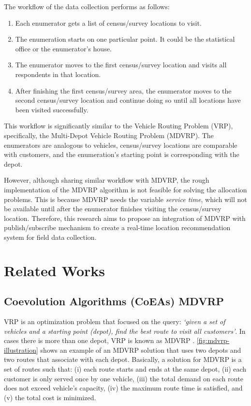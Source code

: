 \documentclass[conference]{IEEEtran}
\begin{document}
The workflow of the data collection performs as follows: 
\begin{enumerate}
	\item Each enumerator gets a list of census/survey locations to visit. 
	\item The enumeration starts on one particular point. It could be the statistical office or the enumerator's house. 
	\item The enumerator moves to the first census/survey location and visits all respondents in that location. 
	\item After finishing the first census/survey area, the enumerator moves to the second census/survey location and continue doing so until all locations have been visited successfully.
\end{enumerate}
This workflow is significantly similar to the Vehicle Routing Problem (VRP), specifically, the Multi-Depot Vehicle Routing Problem (MDVRP). The enumerators are analogous to vehicles, census/survey locations are comparable with customers, and the enumeration's starting point is corresponding with the depot. 

However, although sharing similar workflow with MDVRP, the rough implementation of the MDVRP algorithm is not feasible for solving the allocation problems. This is because MDVRP needs the variable \textit{service time}, which will not be available until after the enumerator finishes visiting the census/survey location. Therefore, this research aims to propose an integration of MDVRP with publish/subscribe mechanism to create a real-time location recommendation system for field data collection. 


\section{Related Works}
\label{sec:related-works}

\subsection{Coevolution Algorithms (CoEAs) MDVRP}
\label{ssec:evolution-algorithms}
VRP is an optimization problem that focused on the query: \textit{`given a set of vehicles and a starting point (depot), find the best route to visit all customers'}. In cases there is more than one depot, VRP is known as MDVRP \cite{montoya-torres_literature_2015}. \autoref{fig:mdvrp-illustration} shows an example of an MDVRP solution that uses two depots and two routes that associate with each depot. Basically, a solution for MDVRP is a set of routes such that: (i) each route starts and ends at the same depot, (ii) each customer is only served once by one vehicle, (iii) the total demand on each route does not exceed vehicle's capacity, (iv) the maximum route time is satisfied, and (v) the total cost is minimized.
\end{document}
